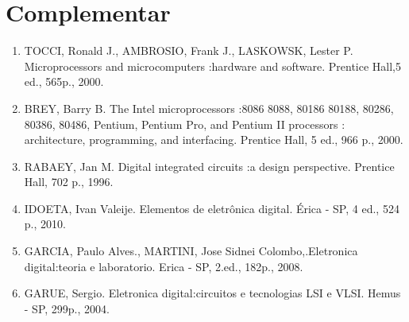 \documentclass[12pt,consuni]{uftex2}
\begin{document}
\section{Complementar}

\begin{enumerate}
\item TOCCI, Ronald J., AMBROSIO, Frank J., LASKOWSK, Lester P. Microprocessors and microcomputers :hardware and software. Prentice Hall,5 ed., 565p., 2000.
\item BREY, Barry B. The Intel microprocessors :8086 8088, 80186 80188, 80286, 80386, 80486, Pentium, Pentium Pro, and Pentium II processors : architecture, programming, and interfacing. Prentice Hall, 5 ed., 966 p., 2000.
\item RABAEY, Jan M. Digital integrated circuits :a design perspective. Prentice Hall, 702 p., 1996.
\item IDOETA, Ivan Valeije. Elementos de eletrônica digital. Érica - SP, 4 ed., 524 p., 2010.
\item GARCIA, Paulo Alves., MARTINI, Jose Sidnei Colombo,.Eletronica digital:teoria e laboratorio. Erica - SP, 2.ed., 182p., 2008.
\item GARUE, Sergio. Eletronica digital:circuitos e tecnologias LSI e VLSI. Hemus - SP, 299p., 2004.
\end{enumerate}
\end{document}
